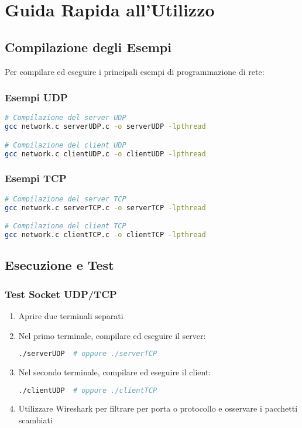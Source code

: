 \documentclass[12pt,a4paper]{article}
\begin{document}
\section{Guida Rapida all'Utilizzo}

\subsection{Compilazione degli Esempi}

Per compilare ed eseguire i principali esempi di programmazione di rete:

\subsubsection{Esempi UDP}
\begin{lstlisting}[language=bash, caption=Compilazione server/client UDP]
# Compilazione del server UDP
gcc network.c serverUDP.c -o serverUDP -lpthread

# Compilazione del client UDP
gcc network.c clientUDP.c -o clientUDP -lpthread
\end{lstlisting}

\subsubsection{Esempi TCP}
\begin{lstlisting}[language=bash, caption=Compilazione server/client TCP]
# Compilazione del server TCP
gcc network.c serverTCP.c -o serverTCP -lpthread

# Compilazione del client TCP
gcc network.c clientTCP.c -o clientTCP -lpthread
\end{lstlisting}

\subsection{Esecuzione e Test}

\subsubsection{Test Socket UDP/TCP}
\begin{enumerate}
    \item Aprire due terminali separati
    \item Nel primo terminale, compilare ed eseguire il server:
    \begin{lstlisting}[language=bash]
./serverUDP  # oppure ./serverTCP
    \end{lstlisting}
    \item Nel secondo terminale, compilare ed eseguire il client:
    \begin{lstlisting}[language=bash]
./clientUDP  # oppure ./clientTCP
    \end{lstlisting}
    \item Utilizzare Wireshark per filtrare per porta o protocollo e osservare i pacchetti scambiati
\end{enumerate}
\end{document}
